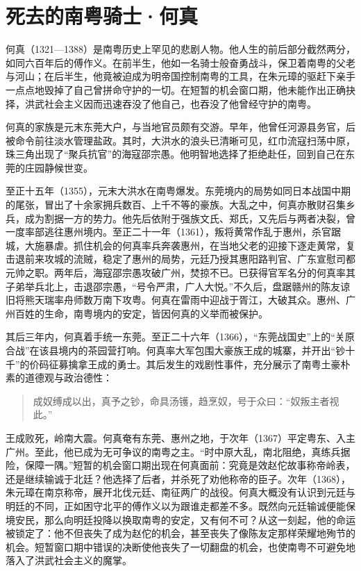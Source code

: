 

\chapter{死去的南粤骑士·何真}

何真（1321—1388）是南粤历史上罕见的悲剧人物。他人生的前后部分截然两分，如同六百年后的傅作义。在前半生，他如一名骑士般奋勇战斗，保卫着南粤的父老与河山；在后半生，他竟被迫成为明帝国控制南粤的工具，在朱元璋的驱赶下亲手一点点地毁掉了自己曾拼命守护的一切。在短暂的机会窗口期，他未能作出正确抉择，洪武社会主义因而迅速吞没了他自己，也吞没了他曾经守护的南粤。

何真的家族是元末东莞大户，与当地官员颇有交游。早年，他曾任河源县务官，后被命令前往淡水管理盐政。其时，大洪水的浪头已清晰可见，红巾流寇扫荡中原，珠三角出现了“聚兵抗官”的海寇邵宗愚。他明智地选择了拒绝赴任，回到自己在东莞的庄园静候世变。

至正十五年（1355），元末大洪水在南粤爆发。东莞境内的局势如同日本战国中期的尾张，冒出了十余家拥兵数百、上千不等的豪族。大乱之中，何真亦散财召集乡兵，成为割据一方的势力。他先后依附于强族文氏、郑氏，又先后与两者决裂，曾一度率部逃往惠州境内。至正二十一年（1361），叛将黄常作乱于惠州，杀官踞城，大施暴虐。抓住机会的何真率兵奔袭惠州，在当地父老的迎接下逐走黄常，复击退前来攻城的流贼，稳定了惠州的局势，元廷乃授其惠阳路判官、广东宣慰司都元帅之职。两年后，海寇邵宗愚攻破广州，焚掠不已。已获得官军名分的何真率其子弟举兵北上，击退邵宗愚，“号令严肃，广人大悦。”不久后，盘踞赣州的陈友谅旧将熊天瑞率舟师数万南下攻粤。何真在雷雨中迎战于胥江，大破其众。惠州、广州百姓的生命，南粤境内的安定，皆因何真的义举而被保护。

其后三年内，何真着手统一东莞。至正二十六年（1366），“东莞战国史”上的“关原合战”在该县境内的茶园营打响。何真率大军包围大豪族王成的城寨，并开出“钞十千”的价码征募擒拿王成的勇士。其后发生的戏剧性事件，充分展示了南粤土豪朴素的道德观与政治德性：

\begin{quote}
成奴缚成以出，真予之钞，命具汤镬，趋烹奴，号于众曰：“奴叛主者视此。”
\end{quote}

王成败死，岭南大震。何真奄有东莞、惠州之地，于次年（1367）平定粤东、入主广州。至此，他已成为无可争议的南粤之主。“时中原大乱，南北阻绝，真练兵据险，保障一隅。”短暂的机会窗口期出现在何真面前：究竟是效赵佗故事称帝岭表，还是继续输诚于北廷？他选择了后者，并杀死了劝他称帝的臣子。次年（1368），朱元璋在南京称帝，展开北伐元廷、南征两广的战役。何真大概没有认识到元廷与明廷的不同，正如困守北平的傅作义以为跟谁走都差不多。既然向元廷输诚便能保境安民，那么向明廷投降以换取南粤的安定，又有何不可？从这一刻起，他的命运被锁定了：他不但丧失了成为赵佗的机会，甚至丧失了像陈友定那样荣耀地殉节的机会。短暂窗口期中错误的决断使他丧失了一切翻盘的机会，也使南粤不可避免地落入了洪武社会主义的魔掌。

